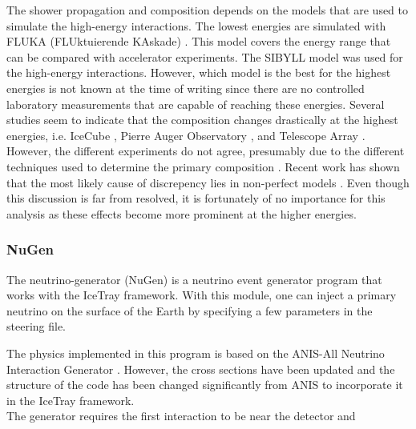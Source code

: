 \noindent The shower propagation and composition depends on the models that are used to simulate the high-energy interactions. The lowest energies are simulated with FLUKA  (FLUktuierende KAskade) \cite{Battistoni:2015epi}. This model covers the energy range that can be compared with accelerator experiments.  The SIBYLL model was used for the high-energy interactions. However, which model is the best for the highest energies is not known at the time of writing since there are no controlled laboratory measurements that are capable of reaching these energies. Several studies seem to indicate that the composition changes drastically at the highest energies, i.e. IceCube \cite{Rawlins:2016bkc}, Pierre Auger Observatory \cite{Porcelli:2015jli}, and Telescope Array \cite{Belz:2015cvi}. However, the different experiments do not agree, presumably due to the different techniques used to determine the primary composition \cite{samDeRidder}. Recent work has shown that the most likely cause of discrepency lies in non-perfect models \cite{Dembinski:2019uta}. Even though this discussion is far from resolved, it is fortunately of no importance for this analysis as these effects become more prominent at the higher energies.\\

\subsubsection{NuGen}
\label{subsec:nugen}
The neutrino-generator (NuGen) is a neutrino event generator program that works with the IceTray framework. With this module, one can inject a primary neutrino on the surface of the Earth by specifying a few parameters in the steering file.

The physics implemented in this program is based on the ANIS-All Neutrino Interaction Generator \cite{Gazizov:2004va}. However, the cross sections have been updated and the structure of the code has been changed significantly from ANIS to incorporate it in the IceTray framework.\\

\noindent The generator requires the first interaction to be near the detector and

